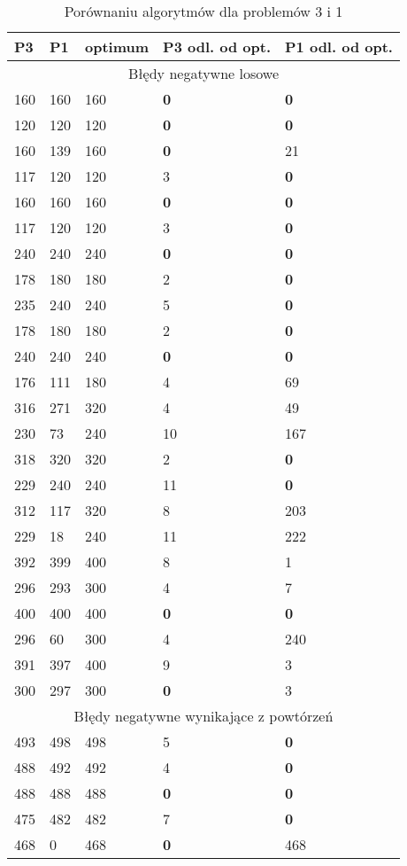 \documentclass[a4paper]{article}
\begin{document}
\begin{table}[H]
\caption{Porównaniu algorytmów dla problemów 3 i 1}
\begin{tabular}{|p{2cm}|p{2cm}|p{2cm}|p{2cm}|p{2cm}|}
\hline
\multicolumn{1}{|l|}{P3} & \multicolumn{1}{l|}{P1} &
\multicolumn{1}{l|}{optimum} & \multicolumn{1}{l|}{P3 odl. od opt.} &
\multicolumn{1}{l|}{P1 odl. od opt.} \\ \hline
\multicolumn{5}{|c|}{Błędy negatywne losowe} \\ \hline
160 & 160 & 160 & \textbf{0} & \textbf{0} \\ \hline
120 & 120 & 120 & \textbf{0} & \textbf{0} \\ \hline
160 & 139 & 160 & \textbf{0} & 21 \\ \hline
117 & 120 & 120 & 3 & \textbf{0} \\ \hline
160 & 160 & 160 & \textbf{0} & \textbf{0} \\ \hline
117 & 120 & 120 & 3 & \textbf{0} \\ \hline
240 & 240 & 240 & \textbf{0} & \textbf{0} \\ \hline
178 & 180 & 180 & 2 & \textbf{0} \\ \hline
235 & 240 & 240 & 5 & \textbf{0} \\ \hline
178 & 180 & 180 & 2 & \textbf{0} \\ \hline
240 & 240 & 240 & \textbf{0} & \textbf{0} \\ \hline
176 & 111 & 180 & 4 & 69 \\ \hline
316 & 271 & 320 & 4 & 49 \\ \hline
230 & 73 & 240 & 10 & 167 \\ \hline
318 & 320 & 320 & 2 & \textbf{0} \\ \hline
229 & 240 & 240 & 11 & \textbf{0} \\ \hline
312 & 117 & 320 & 8 & 203 \\ \hline
229 & 18 & 240 & 11 & 222 \\ \hline
392 & 399 & 400 & 8 & 1 \\ \hline
296 & 293 & 300 & 4 & 7 \\ \hline
400 & 400 & 400 & \textbf{0} & \textbf{0} \\ \hline
296 & 60 & 300 & 4 & 240 \\ \hline
391 & 397 & 400 & 9 & 3 \\ \hline
300 & 297 & 300 & \textbf{0} & 3 \\ \hline
\multicolumn{5}{|c|}{Błędy negatywne wynikające z powtórzeń} \\ \hline
493 & 498 & 498 & 5 & \textbf{0} \\ \hline
488 & 492 & 492 & 4 & \textbf{0} \\ \hline
488 & 488 & 488 & \textbf{0} & \textbf{0} \\ \hline
475 & 482 & 482 & 7 & \textbf{0} \\ \hline
468 & 0 & 468 & \textbf{0} & 468 \\ \hline
\end{tabular}
\label{}
\end{table}
\end{document}
